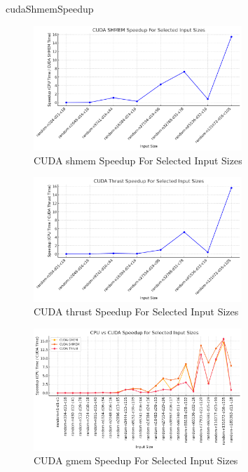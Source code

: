 \documentclass[letterpaper,12pt]{article}
\theoremstyle{remark}
\begin{document}
cudaShmemSpeedup

\begin{figure}[ht]
    \centering
    \includegraphics[width=0.7\textwidth]{cudaShmemSpeedup.png}
    \caption{CUDA shmem Speedup For Selected Input Sizes}
    \label{fig:shmem_speedup}
   
\end{figure}

\begin{figure}[ht]
    \centering
    \includegraphics[width=0.7\textwidth]{cudaThrustSpeedUp.png}
    \caption{CUDA thrust Speedup For Selected Input Sizes}
    \label{fig:thrust_speedup}
   
\end{figure}


\begin{figure}[ht]
    \centering
    \includegraphics[width=0.7\textwidth]{totalSpeedUp.png}
    \caption{CUDA gmem Speedup For Selected Input Sizes}
    \label{fig:gmem_speedup}
\end{figure}
\end{document}
